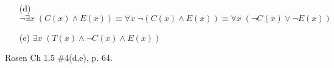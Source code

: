 \documentclass[12pt,addpoints]{exam}
\newcommand{\ra}{\rightarrow}
\begin{document}
\begin{questions}
\begin{solution}
    \begin{itemize}
        \item[(d)] $\neg \exists x\; (C(x) \wedge E(x)) \equiv \forall x\; \neg (C(x) \wedge E(x)) \equiv \forall x\; (\neg C(x) \vee \neg E(x))$
        \item[(e)] $\exists x\; (T(x) \wedge \neg C(x) \wedge E(x))$
    \end{itemize}
    \end{solution}
    
\question Rosen Ch 1.5 \#4(d,e), p. 64.
    \begin{solution}
    \begin{itemize}

\end{itemize}
\end{solution}
\end{questions}
\end{document}
